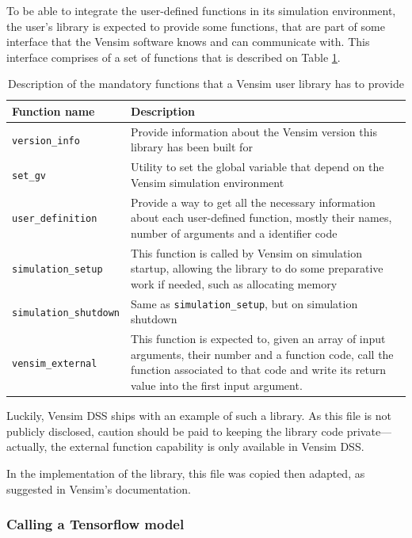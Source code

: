 To be able to integrate the user-defined functions in its simulation environment, the user's library is expected to provide some functions, that are part of some interface that the Vensim software knows and can communicate with. This interface comprises of a set of functions that is described on Table \ref{table:vensim-interface}.
\begin{table}[h]
    \centering
    \begin{tabular}{|m{4.1cm}|m{12cm}|}
        \hline
        Function name & Description \\ \hline
        \texttt{version\_info} & Provide information about the Vensim version this library has been built for \\
        \texttt{set\_gv} & Utility to set the global variable that depend on the Vensim simulation environment \\
        \texttt{user\_definition} & Provide a way to get all the necessary information about each user-defined function, mostly their names, number of arguments and a identifier code \\
        \texttt{simulation\_setup} & This function is called by Vensim on simulation startup, allowing the library to do some preparative work if needed, such as allocating memory \\
        \texttt{simulation\_shutdown} & Same as \texttt{simulation\_setup}, but on simulation shutdown \\
        \texttt{vensim\_external} & This function is expected to, given an array of input arguments, their number and a function code, call the function associated to that code and write its return value into the first input argument.\\
        \hline
    \end{tabular}
    \caption{Description of the mandatory functions that a Vensim user library has to provide}
    \label{table:vensim-interface}
\end{table}

Luckily, %
Vensim DSS ships with an example of such a library. As this file is not publicly disclosed, caution should be paid to keeping the library code private---actually, the external function capability is only available in Vensim DSS.

In the implementation of the library, this file was copied then adapted, as suggested in Vensim's documentation.

\subsubsection{Calling a Tensorflow model}

